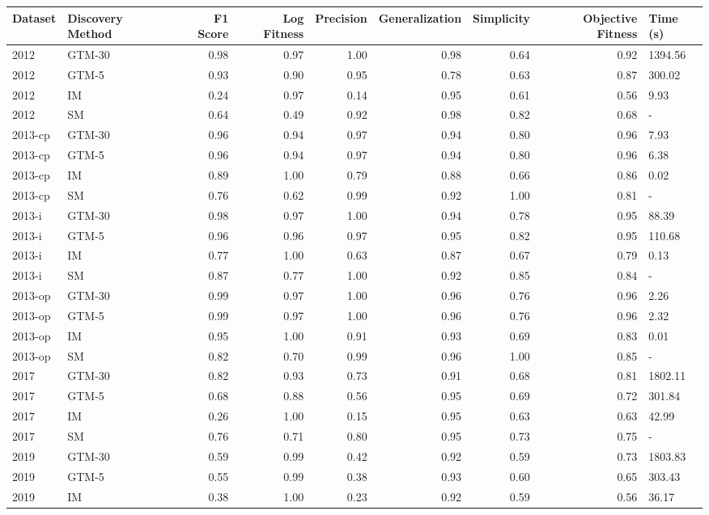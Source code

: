 \begin{tabular}{llrrrrrrl}
\toprule
Dataset & Discovery Method & F1 Score & Log Fitness & Precision & Generalization & Simplicity & Objective Fitness & Time (s) \\
\midrule
2012 & GTM-30 & 0.98 & 0.97 & 1.00 & 0.98 & 0.64 & 0.92 & 1394.56 \\
2012 & GTM-5 & 0.93 & 0.90 & 0.95 & 0.78 & 0.63 & 0.87 & 300.02 \\
2012 & IM & 0.24 & 0.97 & 0.14 & 0.95 & 0.61 & 0.56 & 9.93 \\
2012 & SM & 0.64 & 0.49 & 0.92 & 0.98 & 0.82 & 0.68 & - \\
2013-cp & GTM-30 & 0.96 & 0.94 & 0.97 & 0.94 & 0.80 & 0.96 & 7.93 \\
2013-cp & GTM-5 & 0.96 & 0.94 & 0.97 & 0.94 & 0.80 & 0.96 & 6.38 \\
2013-cp & IM & 0.89 & 1.00 & 0.79 & 0.88 & 0.66 & 0.86 & 0.02 \\
2013-cp & SM & 0.76 & 0.62 & 0.99 & 0.92 & 1.00 & 0.81 & - \\
2013-i & GTM-30 & 0.98 & 0.97 & 1.00 & 0.94 & 0.78 & 0.95 & 88.39 \\
2013-i & GTM-5 & 0.96 & 0.96 & 0.97 & 0.95 & 0.82 & 0.95 & 110.68 \\
2013-i & IM & 0.77 & 1.00 & 0.63 & 0.87 & 0.67 & 0.79 & 0.13 \\
2013-i & SM & 0.87 & 0.77 & 1.00 & 0.92 & 0.85 & 0.84 & - \\
2013-op & GTM-30 & 0.99 & 0.97 & 1.00 & 0.96 & 0.76 & 0.96 & 2.26 \\
2013-op & GTM-5 & 0.99 & 0.97 & 1.00 & 0.96 & 0.76 & 0.96 & 2.32 \\
2013-op & IM & 0.95 & 1.00 & 0.91 & 0.93 & 0.69 & 0.83 & 0.01 \\
2013-op & SM & 0.82 & 0.70 & 0.99 & 0.96 & 1.00 & 0.85 & - \\
2017 & GTM-30 & 0.82 & 0.93 & 0.73 & 0.91 & 0.68 & 0.81 & 1802.11 \\
2017 & GTM-5 & 0.68 & 0.88 & 0.56 & 0.95 & 0.69 & 0.72 & 301.84 \\
2017 & IM & 0.26 & 1.00 & 0.15 & 0.95 & 0.63 & 0.63 & 42.99 \\
2017 & SM & 0.76 & 0.71 & 0.80 & 0.95 & 0.73 & 0.75 & - \\
2019 & GTM-30 & 0.59 & 0.99 & 0.42 & 0.92 & 0.59 & 0.73 & 1803.83 \\
2019 & GTM-5 & 0.55 & 0.99 & 0.38 & 0.93 & 0.60 & 0.65 & 303.43 \\
2019 & IM & 0.38 & 1.00 & 0.23 & 0.92 & 0.59 & 0.56 & 36.17 \\

\end{tabular}
